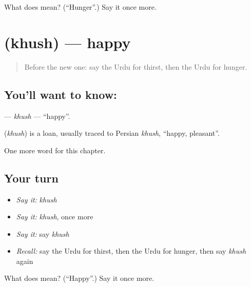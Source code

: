 \begin{tcolorbox}[breakable,colback=teal!4,colframe=teal!35!black,title={Before you move on}]
What does  mean? (\textquotedblleft{}Hunger\textquotedblright{}.) Say it once more.
\end{tcolorbox}
\section[\texorpdfstring{\ur{خوش} (khush)}{خوش (khush)}]{ (khush) — happy}

\label{lesson:UR-C42-khush}



\begin{quote}
Before the new one: say the Urdu for thirst, then the Urdu for hunger.
\end{quote}

\subsection*{You'll want to know: }
\textbf{} — \emph{khush} — \textquotedblleft{}happy\textquotedblright{}.

\begin{cousinweb}
\textbf{} (\emph{khush}) is a loan, usually traced to Persian \emph{khush}, \textquotedblleft{}happy, pleasant\textquotedblright{}.
\end{cousinweb}

\begin{grammarlens}[title={What you've built}]
One more word for this chapter.
\end{grammarlens}

\subsection*{Your turn}
\begin{itemize}
\raggedright
  \item \emph{Say it:} \emph{khush}
  \item \emph{Say it:} \emph{khush}, once more
  \item \emph{Say it:} say \emph{khush}
  \item \emph{Recall:} say the Urdu for thirst, then the Urdu for hunger, then say \emph{khush} again
\end{itemize}

\begin{tcolorbox}[breakable,colback=teal!4,colframe=teal!35!black,title={Before you move on}]
What does  mean? (\textquotedblleft{}Happy\textquotedblright{}.) Say it once more.
\end{tcolorbox}
